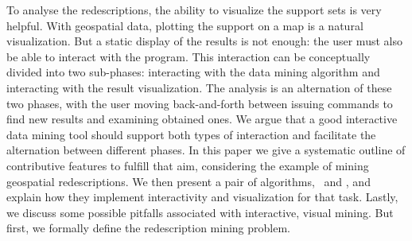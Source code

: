 To analyse
the redescriptions, the ability to visualize the support sets is very
helpful. With geospatial data, plotting the support on a map is a
natural visualization. But a static display of the results is
not enough: the user must also be able to interact with the
program. This interaction can be conceptually divided into two
sub-phases: interacting with the data mining algorithm and interacting
with the result visualization. The analysis is an alternation of these
two phases, with the user moving back-and-forth between issuing
commands to find new results and examining obtained ones. We argue
that a good interactive data mining tool should support both types of
interaction and facilitate the alternation between different
phases. In this paper we give a systematic outline of contributive
features to fulfill that aim, considering the example of mining
geospatial redescriptions. We then present a pair of algorithms,
\ReReMi\ and \Siren, and explain how they implement interactivity and
visualization for that task. Lastly, we discuss some possible pitfalls
associated with interactive, visual mining. But first, we formally
define the redescription mining problem.

